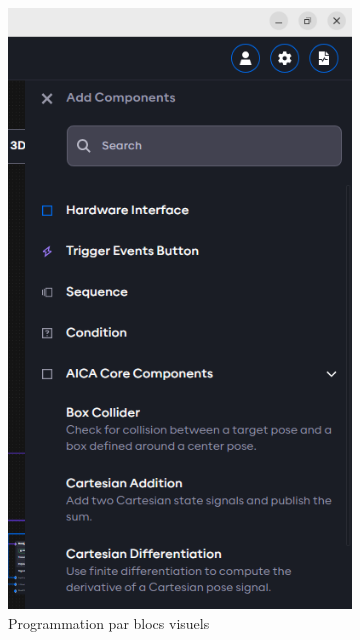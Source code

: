 \begin{figure}[H]
    \centering
    \begin{subfigure}{0.48\textwidth}
        \centering
        \includegraphics[width=0.95\linewidth]{assets/figures/AICA_blocs_fonct.png}
        \caption{Programmation par blocs visuels}
        \label{fig:prog_blocs_visuels}
    \end{subfigure}
    \hfill
    \begin{subfigure}{0.48\textwidth}
        \centering

\end{subfigure}
\end{figure}
